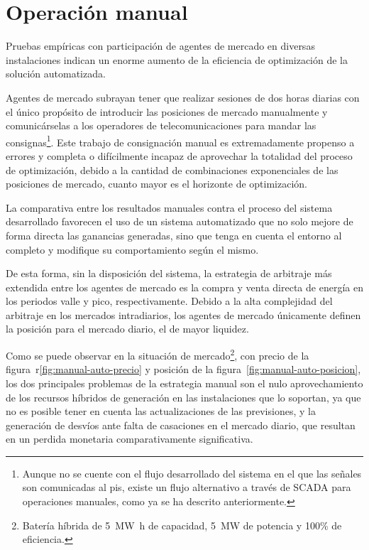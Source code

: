 \section{Operación manual}
\label{makereference7.2}

Pruebas empíricas con participación de agentes de mercado en diversas instalaciones indican un enorme aumento de la eficiencia de optimización de la solución automatizada.

Agentes de mercado subrayan tener que realizar sesiones de dos horas diarias con el único propósito de introducir las posiciones de mercado manualmente y comunicárselas a los operadores de telecomunicaciones para mandar las consignas\footnote{Aunque no se cuente con el flujo desarrollado del sistema en el que las señales son comunicadas al \gls{pis}, existe un flujo alternativo a través de SCADA para operaciones manuales, como ya se ha descrito anteriormente.}. Este trabajo de consignación manual es extremadamente propenso a errores y completa o difícilmente incapaz de aprovechar la totalidad del proceso de optimización, debido a la cantidad de combinaciones exponenciales de las posiciones de mercado, cuanto mayor es el horizonte de optimización.

La comparativa entre los resultados manuales contra el proceso del sistema desarrollado favorecen el uso de un sistema automatizado que no solo mejore de forma directa las ganancias generadas, sino que tenga en cuenta el entorno al completo y modifique su comportamiento según el mismo.

De esta forma, sin la disposición del sistema, la estrategia de arbitraje más extendida entre los agentes de mercado es la compra y venta directa de energía en los periodos valle y pico, respectivamente. Debido a la alta complejidad del arbitraje en los mercados intradiarios, los agentes de mercado únicamente definen la posición para el mercado diario, el de mayor liquidez.

Como se puede observar en la situación de mercado\footnote{Batería híbrida de \SI{5}{{\mega\watt\hour}} de capacidad, \SI{5}{{\mega\watt}} de potencia y 100\% de eficiencia.}, con precio de la figura~r\ref{fig:manual-auto-precio} y posición de la figura~\ref{fig:manual-auto-posicion}, los dos principales problemas de la estrategia manual son el nulo aprovechamiento de los recursos híbridos de generación en las instalaciones que lo soportan, ya que no es posible tener en cuenta las actualizaciones de las previsiones, y la generación de desvíos ante falta de casaciones en el mercado diario, que resultan en un perdida monetaria comparativamente significativa.

